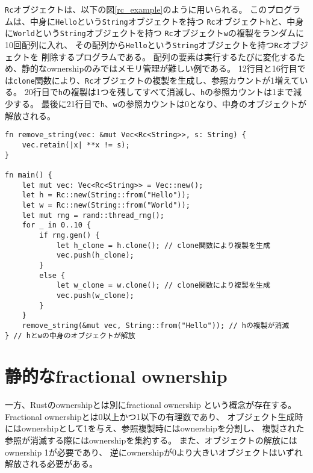 \documentclass{sumiilab-paper}
\theoremstyle{mystyle}
\numberwithin{definition}{chapter} %
\begin{document}
\texttt{Rc}オブジェクトは、以下の図\ref{rc_example}のように用いられる。
このプログラムは、中身に\texttt{Hello}という\texttt{String}オブジェクトを持つ
\texttt{Rc}オブジェクト\texttt{h}と、中身に\texttt{World}という\texttt{String}オブジェクトを持つ
\texttt{Rc}オブジェクト\texttt{w}の複製をランダムに10回配列に入れ、
その配列から\texttt{Hello}という\texttt{String}オブジェクトを持つ\texttt{Rc}オブジェクトを
削除するプログラムである。
配列の要素は実行するたびに変化するため、静的なownershipのみではメモリ管理が難しい例である。
12行目と16行目では\texttt{clone}関数により、\texttt{Rc}オブジェクトの複製を生成し、参照カウントが1増えている。
20行目で\texttt{h}の複製は1つを残してすべて消滅し、\texttt{h}の参照カウントは1まで減少する。
最後に21行目で\texttt{h}、\texttt{w}の参照カウントは0となり、中身のオブジェクトが解放される。
\begin{lstlisting}[caption=Rcオブジェクトの利用例, label=rc_example, captionpos=b]
fn remove_string(vec: &mut Vec<Rc<String>>, s: String) {
    vec.retain(|x| **x != s);
}

fn main() {
    let mut vec: Vec<Rc<String>> = Vec::new();
    let h = Rc::new(String::from("Hello"));
    let w = Rc::new(String::from("World"));
    let mut rng = rand::thread_rng();
    for _ in 0..10 {
        if rng.gen() {
            let h_clone = h.clone(); // clone関数により複製を生成
            vec.push(h_clone);
        }
        else {
            let w_clone = w.clone(); // clone関数により複製を生成
            vec.push(w_clone);
        }
    }
    remove_string(&mut vec, String::from("Hello")); // hの複製が消滅
} // hとwの中身のオブジェクトが解放
\end{lstlisting}

\section{静的なfractional ownership}
一方、Rustのownershipとは別にfractional ownership\cite{DBLP:conf/sas/Boyland03}
という概念が存在する。
Fractional ownershipとは0以上かつ1以下の有理数であり、
オブジェクト生成時にはownershipとして1を与え、参照複製時にはownershipを分割し、
複製された参照が消滅する際にはownershipを集約する。
また、オブジェクトの解放にはownership 1が必要であり、
逆にownershipが0より大きいオブジェクトはいずれ解放される必要がある。
\end{document}
